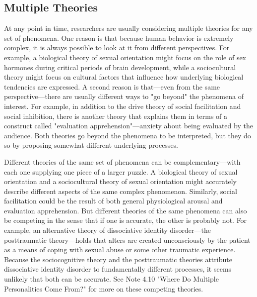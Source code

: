 \subsection{Multiple Theories}

At any point in time, researchers are usually considering multiple theories for any set of phenomena. One reason is that because human behavior is extremely complex, it is always possible to look at it from different perspectives. For example, a biological theory of sexual orientation might focus on the role of sex hormones during critical periods of brain development, while a sociocultural theory might focus on cultural factors that influence how underlying biological tendencies are expressed. A second reason is that---even from the same perspective---there are usually different ways to "go beyond" the phenomena of interest. For example, in addition to the drive theory of social facilitation and social inhibition, there is another theory that explains them in terms of a construct called "evaluation apprehension"---anxiety about being evaluated by the audience. Both theories go beyond the phenomena to be interpreted, but they do so by proposing somewhat different underlying processes.

Different theories of the same set of phenomena can be complementary---with each one supplying one piece of a larger puzzle. A biological theory of sexual orientation and a sociocultural theory of sexual orientation might accurately describe different aspects of the same complex phenomenon. Similarly, social facilitation could be the result of both general physiological arousal and evaluation apprehension. But different theories of the same phenomena can also be competing in the sense that if one is accurate, the other is probably not. For example, an alternative theory of dissociative identity disorder---the posttraumatic theory---holds that alters are created unconsciously by the patient as a means of coping with sexual abuse or some other traumatic experience. Because the sociocognitive theory and the posttraumatic theories attribute dissociative identity disorder to fundamentally different processes, it seems unlikely that both can be accurate. See Note 4.10 "Where Do Multiple Personalities Come From?" for more on these competing theories.


